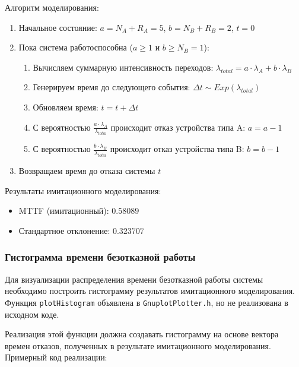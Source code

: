Алгоритм моделирования:
\begin{enumerate}
    \item Начальное состояние: $a = N_A + R_A = 5$, $b = N_B + R_B = 2$, $t = 0$
    \item Пока система работоспособна ($a \geq 1$ и $b \geq N_B = 1$):
    \begin{enumerate}
        \item Вычисляем суммарную интенсивность переходов: $\lambda_{total} = a \cdot \lambda_A + b \cdot \lambda_B$
        \item Генерируем время до следующего события: $\Delta t \sim Exp(\lambda_{total})$
        \item Обновляем время: $t = t + \Delta t$
        \item С вероятностью $\frac{a \cdot \lambda_A}{\lambda_{total}}$ происходит отказ устройства типа A: $a = a - 1$
        \item С вероятностью $\frac{b \cdot \lambda_B}{\lambda_{total}}$ происходит отказ устройства типа B: $b = b - 1$
    \end{enumerate}
    \item Возвращаем время до отказа системы $t$
\end{enumerate}

Результаты имитационного моделирования:
\begin{itemize}
    \item MTTF (имитационный): $0.58089$
    \item Стандартное отклонение: $0.323707$
\end{itemize}

\subsubsection{Гистограмма времени безотказной работы}

Для визуализации распределения времени безотказной работы системы необходимо построить гистограмму результатов имитационного моделирования. Функция \texttt{plotHistogram} объявлена в \texttt{GnuplotPlotter.h}, но не реализована в исходном коде.

Реализация этой функции должна создавать гистограмму на основе вектора времен отказов, полученных в результате имитационного моделирования. Примерный код реализации:

